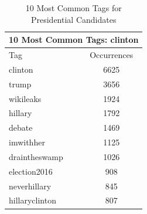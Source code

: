 \documentclass[12pt,a4paper]{report}
\begin{document}
\begin{table}[ht]
\begin{tabular}[t]{|l|c|}
      \multicolumn{2}{|c|}{10 Most Common Tags: clinton} \\
      \hline
      Tag & Occurrences \\ [0.5ex]
      \hline
      clinton &  6625 \\
      trump & 3656 \\
      wikileaks & 1924 \\
      hillary & 1792 \\
      debate & 1469 \\
      imwithher & 1125 \\
      draintheswamp & 1026 \\
      election2016 & 908 \\
      neverhillary & 845 \\
      hillaryclinton & 807 \\
      \hline
    \end{tabular}
    \caption{10 Most Common Tags for Presidential Candidates}
    \label{t:4}
  \end{table}
  \clearpage
\end{document}
